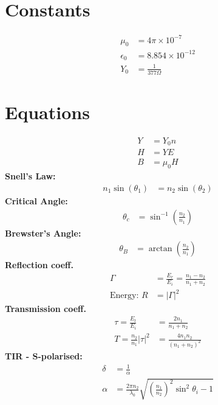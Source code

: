 \documentclass[landscape,a4paper]{article}
\begin{document}
\begin{multicols}{3}
	\section{Constants}
	\begin{align}
		\mu_0 &= 4\pi \times 10^{-7}\\
		\epsilon_0 &= 8.854 \times 10^{-12}\\
		Y_0 &= \frac{1}{377 \Omega}
	\end{align}
	
	\section{Equations}
	\begin{align}
		Y &= Y_0 n\\
		H &= YE\\
		B &= \mu_0 H
	\end{align}
	\textbf{Snell's Law: }
	\begin{align}
		n_1 \sin(\theta_1) &= n_2 \sin(\theta_2)
	\end{align}
	\textbf{Critical Angle:}
	\begin{align}
		\theta_c &= \sin^{-1}\left( \frac{n_2}{n_1} \right)
	\end{align}
	\textbf{Brewster's Angle:}
	\begin{align}
		\theta_B &=  \arctan \left( \frac{n_2}{n_1} \right)
	\end{align}
	\textbf{Reflection coeff.}
	\begin{align}
		\Gamma &= \frac{E_r}{E_i} = \frac{n_1 - n_2}{n_1 + n_2}\\
		\text{Energy: } R  &=  |\Gamma|^2
	\end{align}
	\textbf{Transmission coeff.}
	\begin{align}
		\tau = \frac{E_t}{E_i} &= \frac{2n_1}{n_1 + n_2}\\
		T = \frac{n_2}{n_1} |\tau|^2 &= \frac{4 n_1 n_2}{(n_1 + n_2)^2}
	\end{align}
	\textbf{TIR - S-polarised:}
	\begin{align}
		\delta &= \frac{1}{\alpha}\\
		\alpha &= \frac{2\pi n_2}{\lambda_0} \sqrt{\left( \frac{n_1}{n_2} \right)^2 \sin^2\theta_i - 1}\\

\end{align}
\end{multicols}
\end{document}
